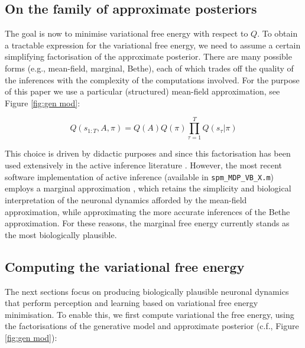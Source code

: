 \documentclass[review,12pt,authoryear]{elsarticle}
\begin{document}
\begin{figure}
    \label{fig: VFE interpretations}
\end{figure}


\subsection{On the family of approximate posteriors}

The goal is now to minimise variational free energy with respect to $Q$. To obtain a tractable expression for the variational free energy, we need to assume a certain simplifying factorisation of the approximate posterior. There are many possible forms \citep{parrNeuronalMessagePassing2019,yedidiaConstructingFreeEnergyApproximations2005,heskesConvexityArgumentsEfficient2006} (e.g., mean-field, marginal, Bethe), each of which trades off the quality of the inferences with the complexity of the computations involved. For the purpose of this paper we use a particular (structured) mean-field approximation, see Figure \ref{fig:gen mod}:
  		
  		\begin{equation}
  		\label{eq: mean field approx}
  		    Q(s_{1:T},A,\pi) = Q(A)Q(\pi) \prod_{\tau =1}^T Q(s_\tau|\pi)
  		\end{equation}
  		
This choice is driven by didactic purposes and since this factorisation has been used extensively in the active inference literature \citep{fristonDeepTemporalModels2018,fristonGraphicalBrainBelief2017,fristonActiveInferenceProcess2017}. However, the most recent software implementation of active inference (available in \texttt{spm\_MDP\_VB\_X.m}) employs a marginal approximation \citep{parrNeuronalMessagePassing2019,parrComputationalNeurologyActive2019}, which retains the simplicity and biological interpretation of the neuronal dynamics afforded by the mean-field approximation, while approximating the more accurate inferences of the Bethe approximation. For these reasons, the marginal free energy currently stands as the most biologically plausible.

\subsection{Computing the variational free energy}

The next sections focus on producing biologically plausible neuronal dynamics that perform perception and learning based on variational free energy minimisation. To enable this, we first compute variational the free energy, using the factorisations of the generative model and approximate posterior (c.f., Figure \ref{fig:gen mod}):
\end{document}
